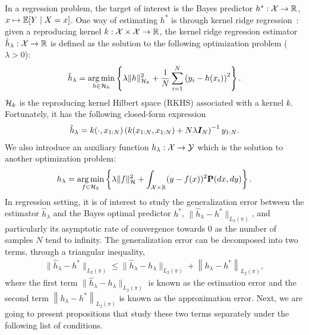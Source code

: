 In a regression problem, the target of interest is the Bayes predictor $h^\ast : \mathcal{X} \to \mathbb{R}$, $x \mapsto \operatorname{\mathbb{E}}[Y \mid X = x]$. 
One way of estimating $h^\ast$ is through kernel ridge regression~\citep{fischer2020sobolev}: given a reproducing kernel $k:\mathcal{X} \times \mathcal{X} \to \mathbb{R}$, the kernel ridge regression estimator $\hat{h}_\lambda: \mathcal{X} \to \mathbb{R}$ is defined as the solution to the following optimization problem ($\lambda > 0$):
\begin{align}\label{eq:opt}
    \hat{h}_\lambda
    = \operatorname*{arg\,min}_{h \in \mathcal{H}_k} \left\{ \lambda\|h\|_{\mathcal{H}_k}^2 + \frac{1}{N} \sum_{i=1}^N \left( y_i - h (x_i) \right)^2 \right\}.
\end{align}
$\mathcal{H}_k$ is the reproducing kernel Hilbert space (RKHS) associated with a kernel $k$.
Fortunately, it has the following closed-form expression~\citep[Section 7]{gretton2013introduction} 
\begin{align*}
    \hat{h}_\lambda = k(\cdot, x_{1:N}) \left( k(x_{1:N}, x_{1:N}) + N \lambda \boldsymbol{I}_N \right)^{-1} y_{1:N} .
\end{align*}
We also introduce an auxiliary function $h_\lambda: \mathcal{X} \to \mathcal{Y}$ which is the solution to another optimization problem:
\begin{align}\label{eq:opt_dummy}
    h_\lambda = \operatorname*{arg\,min}_{f \in \mathcal{H}_k } \left\{ \lambda\|f\|_{\mathcal{H}}^2 + \int_{\mathcal{X} \times \mathbb{R}} ( y - f(x))^2 \mathbf{P}(dx, dy) \right\} .
\end{align}
In regression setting, it is of interest to study the generalization error between the estimator $\hat{h}_\lambda$ and the Bayes optimal predictor $h^\ast$, $\| \hat{h}_\lambda - h^\ast \|_{L_2(\pi)}$, and particularly its asymptotic rate of convergence towards $0$ as the number of samples $N$ tend to infinity.
The generalization error can be decomposed into two terms, through a triangular inequality,
\begin{align}\label{eq:bias_variance_decompose}
    \| \hat{h}_\lambda - h^\ast \|_{L_2(\pi)} \leq \| \hat{h}_\lambda - h_\lambda \|_{L_2(\pi)} + \left\| h_\lambda  - h^\ast \right\|_{L_2(\pi)},
\end{align}
where the first term $\| \hat{h}_\lambda - h_\lambda \|_{L_2(\pi)}$ is known as the estimation error and the second term $ \left\| h_\lambda  - h^\ast \right\|_{L_2(\pi)} $ is known as the approximation error.
Next, we are going to present propositions that study these two terms separately under the following list of conditions.
